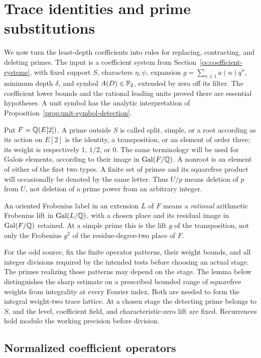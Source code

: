 \section{Trace identities and prime substitutions}
\label{sec:trace-calculus}

We now turn the least-depth coefficients into rules for replacing,
contracting, and deleting primes. The input is a coefficient system
from Section~\ref{cs:coefficient-systems}, with fixed support $S$,
characters $\eta,\psi$, expansion $g=\sum_{n\ge1}a(n)q^n$,
minimum depth $\delta$, and symbol $A(D)\in\mathbb F_2$, extended by zero
off its filter. The coefficient lower bounds and the rational leading
units proved there are essential hypotheses. A unit symbol has the
analytic interpretation of Proposition~\ref{prop:unit-symbol-detection}.

Put $F=\mathbb Q(E[2])$.  A prime outside $S$ is called split, simple, or a root
according as its action on $E[2]$ is the identity, a transposition, or an
element of order three; its weight is respectively $1$, $1/2$, or $0$.
The same terminology will be used for Galois elements, according to their
image in $\operatorname{Gal}(F/\mathbb Q)$.  A nonroot is an element of either of the first two
types.  A finite set of primes and its squarefree product will occasionally
be denoted by the same letter.  Thus $U/p$ means deletion of $p$ from $U$,
not deletion of a prime power from an arbitrary integer.

An oriented Frobenius label in an extension $L$ of $F$ means a
\emph{rational} arithmetic Frobenius lift in $\operatorname{Gal}(L/\mathbb Q)$, with
a chosen place and its residual image in $\operatorname{Gal}(F/\mathbb Q)$ retained.
At a simple prime this is the lift $g$ of the transposition, not
only the Frobenius $g^2$ of the residue-degree-two place of $F$.

For the odd source, fix the finite operator patterns, their weight bounds,
and all integer divisions required by the intended tests before choosing
an actual stage. The primes realizing those patterns may depend on the
stage. The lemma below distinguishes the sharp estimate on a prescribed
bounded range of squarefree weights from integrality at every Fourier
index. Both are needed to form the integral weight-two trace lattice. At a
chosen stage the detecting prime belongs to $S$, and the level,
coefficient field, and characteristic-zero lift are fixed. Recurrences
hold modulo the working precision before division.

\subsection{Normalized coefficient operators}

